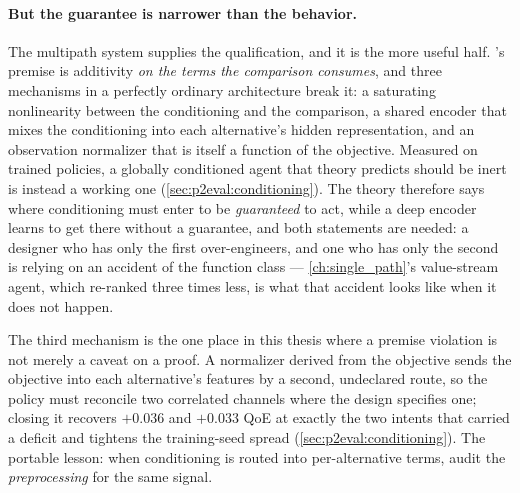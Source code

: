 \paragraph{But the guarantee is narrower than the behavior.} The multipath system supplies the
qualification, and it is the more useful half. 's premise is additivity \emph{on the
terms the comparison consumes}, and three mechanisms in a perfectly ordinary architecture break it: a
saturating nonlinearity between the conditioning and the comparison, a shared encoder that mixes the
conditioning into each alternative's hidden representation, and an observation normalizer that is itself
a function of the objective. Measured on trained policies, a globally conditioned agent that theory
predicts should be inert is instead a working one (\cref{sec:p2eval:conditioning}). The theory therefore
says where conditioning must enter to be \emph{guaranteed} to act, while a deep encoder learns to get
there without a guarantee, and both statements are needed: a designer who has only the first
over-engineers, and one who has only the second is relying on an accident of the function class ---
\cref{ch:single_path}'s value-stream agent, which re-ranked three times less, is what that accident
looks like when it does not happen.

The third mechanism is the one place in this thesis where a premise violation is not merely a caveat on
a proof. A normalizer derived from the objective sends the objective into each alternative's features by
a second, undeclared route, so the policy must reconcile two correlated channels where the design
specifies one; closing it recovers $+0.036$ and $+0.033$ QoE at exactly the two intents that carried a
deficit and tightens the training-seed spread (\cref{sec:p2eval:conditioning}). The portable lesson:
when conditioning is routed into per-alternative terms, audit the \emph{preprocessing} for the same
signal.

